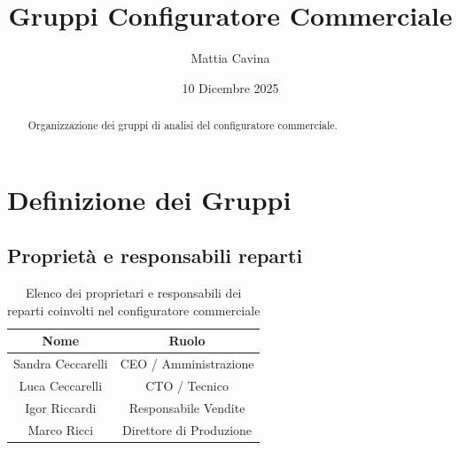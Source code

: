 \documentclass[12pt, a4paper]{article} %
\title{Gruppi Configuratore Commerciale}
\author{Mattia Cavina}
\date{10 Dicembre 2025}
\begin{document}
\maketitle

\begin{abstract}
    Organizzazione dei gruppi di analisi del configuratore commerciale.
\end{abstract}

\section{Definizione dei Gruppi}
\subsection{Proprietà e responsabili reparti}
\begin{table}[!ht]
    \centering
    \begin{tabular}{|c|c|}
        \hline
        \textbf{Nome}     & \textbf{Ruolo}          \\
        \hline
        Sandra Ceccarelli & CEO / Amministrazione   \\
        \hline
        Luca Ceccarelli   & CTO / Tecnico           \\
        \hline
        Igor Riccardi     & Responsabile Vendite    \\
        \hline
        Marco Ricci       & Direttore di Produzione \\
        \hline
    \end{tabular}\label{TableOwners}
    \caption{Elenco dei proprietari e responsabili dei reparti coinvolti nel configuratore commerciale}
\end{table}
\end{document}
